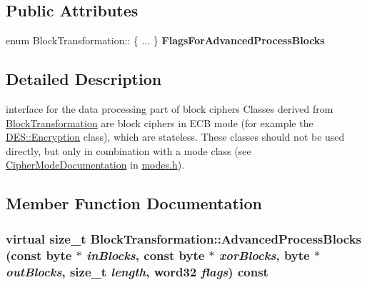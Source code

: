 \subsection*{Public Attributes}
\begin{DoxyCompactItemize}
\item 
\hypertarget{class_block_transformation_adbdffb84a7518cb2b44378111a6ee69b}{
enum BlockTransformation:: \{ ... \}  {\bfseries FlagsForAdvancedProcessBlocks}}
\label{class_block_transformation_adbdffb84a7518cb2b44378111a6ee69b}

\end{DoxyCompactItemize}


\subsection{Detailed Description}
interface for the data processing part of block ciphers Classes derived from \hyperlink{class_block_transformation}{BlockTransformation} are block ciphers in ECB mode (for example the \hyperlink{class_d_e_s_acf2cdef8c9a64ca67a44117658890aa5}{DES::Encryption} class), which are stateless. These classes should not be used directly, but only in combination with a mode class (see \hyperlink{struct_cipher_mode_documentation}{CipherModeDocumentation} in \hyperlink{modes_8h}{modes.h}). 

\subsection{Member Function Documentation}
\hypertarget{class_block_transformation_a91a57e51748a6b91a18d8608b47ea896}{
\subsubsection[{AdvancedProcessBlocks}]{\setlength{\rightskip}{0pt plus 5cm}virtual size\_\-t BlockTransformation::AdvancedProcessBlocks (const byte $\ast$ {\em inBlocks}, \/  const byte $\ast$ {\em xorBlocks}, \/  byte $\ast$ {\em outBlocks}, \/  size\_\-t {\em length}, \/  word32 {\em flags}) const}}
\label{class_block_transformation_a91a57e51748a6b91a18d8608b47ea896}


